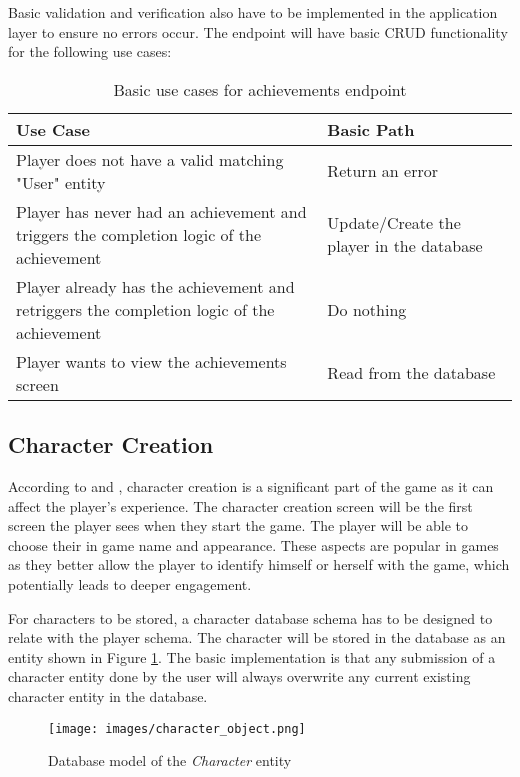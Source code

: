 Basic validation and verification also have to be implemented in the application layer to ensure no errors occur. The endpoint will have basic CRUD functionality for the following use cases:

\begin{table}[H]
    \centering
    \caption{Basic use cases for achievements endpoint}
    \label{table:achievements_usecases}
    \begin{tabular}{|p{11cm}|p{5cm}|}
        \hline
        \textbf{Use Case} & \textbf{Basic Path} \\
        \hline
        Player does not have a valid matching "User" entity & Return an error \\
        \hline
        Player has never had an achievement and triggers the completion logic of the achievement & Update/Create the player in the database \\
        \hline
        Player already has the achievement and retriggers the completion logic of the achievement & Do nothing \\
        \hline
        Player wants to view the achievements screen & Read from the database \\
        \hline
    \end{tabular}
\end{table}

\subsection{Character Creation}
According to \cite{anastasio26impact} and \cite{adams2013crash}, character creation is a significant part of the game as it can affect the player's experience. The character creation screen will be the first screen the player sees when they start the game. The player will be able to choose their in game name and appearance. These aspects are popular in games as they better allow the player to identify himself or herself with the game, which potentially leads to deeper engagement.

For characters to be stored, a character database schema has to be designed to relate with the player schema. The character will be stored in the database as an entity shown in Figure \ref{fig:character}. The basic implementation is that any submission of a character entity done by the user will always overwrite any current existing character entity in the database.
\begin{figure}[H]
    \centering
    \texttt{[image: images/character\_object.png]}
    \caption{Database model of the \textit{Character} entity}
    \label{fig:character}
\end{figure}

